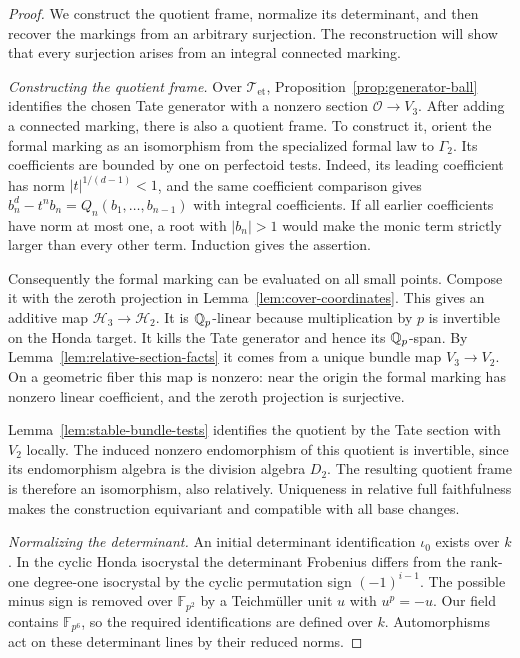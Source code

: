 \begin{proof}
We construct the quotient frame, normalize its determinant, and then
recover the markings from an arbitrary surjection.  The reconstruction
will show that every surjection arises from an integral connected marking.

\smallskip\noindent\emph{Constructing the quotient frame.}
Over $\mathcal T_{\mathrm{et}}$, Proposition~\ref{prop:generator-ball} identifies
the chosen Tate generator with a nonzero section
$\mathcal O\to V_3$.  After adding a connected marking, there is
also a quotient frame.  To construct it, orient the formal marking
as an isomorphism from the specialized formal law to $\Gamma_2$.
Its coefficients are bounded by one on perfectoid tests.  Indeed,
its leading coefficient has norm $|t|^{1/(d-1)}<1$, and the same
coefficient comparison gives
$b_n^d-t^n b_n=Q_n(b_1,\ldots,b_{n-1})$ with integral coefficients.
If all earlier coefficients have norm at most one, a root with
$|b_n|>1$ would make the monic term strictly larger than every
other term.  Induction gives the assertion.

Consequently the formal marking can be evaluated on all small
points.  Compose it with the zeroth projection in
Lemma~\ref{lem:cover-coordinates}.  This gives an additive map
$\mathcal H_3\to\mathcal H_2$.  It is $\mathbb Q_p$-linear because
multiplication by $p$ is invertible on the Honda target.  It kills
the Tate generator and hence its $\mathbb Q_p$-span.  By
Lemma~\ref{lem:relative-section-facts} it comes from a unique
bundle map $V_3\to V_2$.  On a geometric fiber this map is nonzero:
near the origin the formal marking has nonzero linear coefficient,
and the zeroth projection is surjective.

Lemma~\ref{lem:stable-bundle-tests} identifies the quotient by the
Tate section with $V_2$ locally.  The induced nonzero endomorphism
of this quotient is invertible, since its endomorphism algebra is
the division algebra $D_2$.  The resulting quotient frame is
therefore an isomorphism, also relatively.  Uniqueness in relative
full faithfulness makes the construction equivariant and compatible
with all base changes.

\smallskip\noindent\emph{Normalizing the determinant.}
An initial determinant identification $\iota_0$ exists over $k$.
In the cyclic
Honda isocrystal the determinant Frobenius differs from the
rank-one degree-one isocrystal by the cyclic permutation sign
$(-1)^{i-1}$.  The possible minus sign is removed over
$\mathbb F_{p^2}$ by a Teichm\"uller unit $u$ with $u^p=-u$.
Our field contains $\mathbb F_{p^6}$, so the required identifications
are defined over $k$.  Automorphisms act on these determinant
lines by their reduced norms.


\end{proof}
